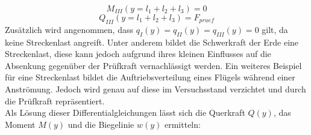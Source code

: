\begin{equation}\label{eq:32}
	M_{III}(y=l_{1}+l_{2}+l_{3})=0
\end{equation}
\begin{equation}\label{eq:33}
	Q_{III}(y=l_{1}+l_{2}+l_{3})=F_{pruef}
\end{equation}
Zusätzlich wird angenommen, dass $q_{I}(y)=q_{II}(y)=q_{III}(y)=0$ gilt, da keine Streckenlast angreift. Unter anderem bildet die Schwerkraft der Erde eine Streckenlast, diese kann jedoch aufgrund ihres kleinen Einflusses auf die Absenkung gegenüber der Prüfkraft vernachlässigt werden. Ein weiteres Beispiel für eine Streckenlast bildet die Auftriebsverteilung eines Flügels während einer Anströmung. Jedoch wird genau auf diese im Versuchsstand verzichtet und durch die Prüfkraft repräsentiert.\\

\noindent Als Lösung dieser Differentialgleichungen lässt sich die Querkraft $Q(y)$, das Moment $M(y)$ und die Biegelinie $w(y)$ ermitteln:\\

